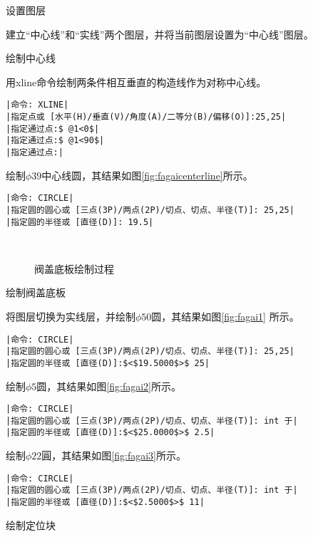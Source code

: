 
\begin{procedure}
\item 设置图层

建立“中心线”和“实线”两个图层，并将当前图层设置为“中心线”图层。
\item 绘制中心线

用xline命令绘制两条件相互垂直的构造线作为对称中心线。
\begin{lstlisting}
|命令: XLINE|
|指定点或 [水平(H)/垂直(V)/角度(A)/二等分(B)/偏移(O)]:25,25|
|指定通过点:$ @1<0$|
|指定通过点:$ @1<90$|
|指定通过点:|
\end{lstlisting}
绘制$\phi 39$中心线圆，其结果如图\ref{fig:fagaicenterline}所示。
\begin{lstlisting}
|命令: CIRCLE|
|指定圆的圆心或 [三点(3P)/两点(2P)/切点、切点、半径(T)]: 25,25|
|指定圆的半径或 [直径(D)]: 19.5|
\end{lstlisting}
\begin{figure}[htbp]
\centering
{}\hspace{30pt}
\\
\hspace{30pt}
\caption{阀盖底板绘制过程}
\end{figure}
\item 绘制阀盖底板

将图层切换为实线层，并绘制$\phi 50$圆，其结果如图\ref{fig:fagai1} 所示。
\begin{lstlisting}
|命令: CIRCLE|
|指定圆的圆心或 [三点(3P)/两点(2P)/切点、切点、半径(T)]: 25,25|
|指定圆的半径或 [直径(D)]:$<$19.5000$>$ 25|
\end{lstlisting}
绘制$\phi 5$圆，其结果如图\ref{fig:fagai2}所示。
\begin{lstlisting}
|命令: CIRCLE|
|指定圆的圆心或 [三点(3P)/两点(2P)/切点、切点、半径(T)]: int 于|
|指定圆的半径或 [直径(D)]:$<$25.0000$>$ 2.5|
\end{lstlisting}
绘制$\phi 22$圓，其结果如图\ref{fig:fagai3}所示。
\begin{lstlisting}
|命令: CIRCLE|
|指定圆的圆心或 [三点(3P)/两点(2P)/切点、切点、半径(T)]: int 于|
|指定圆的半径或 [直径(D)]:$<$2.5000$>$ 11|
\end{lstlisting}
\item 绘制定位块


\end{procedure}
